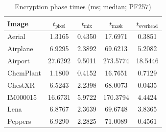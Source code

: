 \begin{table}[ht!]
\centering
\caption{Encryption phase times (ms; median; PF257)}
\label{stab:perf_phase_time_subb}

{\scriptsize

\begin{tabular*}{\columnwidth}{@{\extracolsep{\fill}} l
                S[table-format=2.4]
                S[table-format=1.4]
                S[table-format=3.4]
                S[table-format=2.4] @{}}
\hline
\textbf{Image} &
$t_{\mathrm{pixel}}$ &
$t_{\mathrm{mix}}$ &
$t_{\mathrm{mask}}$ &
$t_{\mathrm{overhead}}$ \\
\hline
Aerial        &  1.3165 & 0.4350 &  17.6971 & 0.3851 \\
Airplane      &  6.9295 & 2.3892 &  69.6213 & 5.2082 \\
Airport       & 27.6292 & 9.5011 & 273.5774 & 18.5446 \\
ChemPlant     &  1.1800 & 0.4152 &  16.7651 & 0.7129 \\
ChestXR       &  6.5243 & 2.2398 &  68.0073 & 0.0435 \\
IM000015      & 16.6731 & 5.9722 & 170.3794 & 4.4424 \\
Lena          &  6.8767 & 2.3639 &  69.6748 & 3.8365 \\
Peppers       &  6.9290 & 2.2825 &  71.0089 & 0.4561 \\
\hline
\end{tabular*}
}
\end{table}

